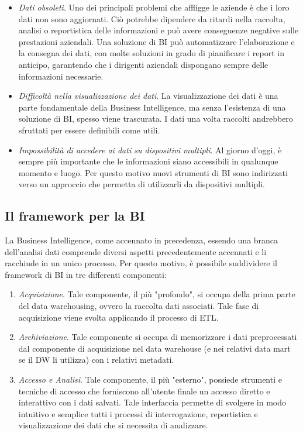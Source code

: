 \begin{itemize}
    \item \textit{Dati obsoleti}. Uno dei principali problemi che affligge le aziende è che i loro dati non sono aggiornati. Ciò potrebbe dipendere da ritardi nella raccolta, analisi o reportistica delle informazioni e può avere conseguenze negative sulle prestazioni aziendali. Una soluzione di BI può automatizzare l'elaborazione e la consegna dei dati, con molte soluzioni in grado di pianificare i report in anticipo, garantendo che i dirigenti aziendali dispongano sempre delle informazioni necessarie.
    \item \textit{Difficoltà nella visualizzazione dei dati}. La visualizzazione dei dati è una parte fondamentale della Business Intelligence, ma senza l'esistenza di una soluzione di BI, spesso viene trascurata. I dati una volta raccolti andrebbero sfruttati per essere definibili come utili.
    \item \textit{Impossibilità di accedere ai dati su dispositivi multipli}. Al giorno d'oggi, è sempre più importante che le informazioni siano accessibili in qualunque momento e luogo. Per questo motivo nuovi strumenti di BI sono indirizzati verso un approccio che permetta di utilizzarli da dispositivi multipli.
\end{itemize}

\subsection{Il framework per la BI}
La Business Intelligence, come accennato in precedenza, essendo una branca dell'analisi dati comprende diversi aspetti precedentemente accennati e li racchiude in un unico processo. Per questo motivo, è possibile suddividere il framework di BI in tre differenti componenti:\cite{academiaedu_bi_integrated_approach}

\begin{enumerate}
    \item \textit{Acquisizione}. Tale componente, il più "profondo", si occupa della prima parte del data warehousing, ovvero la raccolta dati associati. Tale fase di acquisizione viene svolta applicando il processo di ETL.
    \item \textit{Archiviazione}. Tale componente si occupa di memorizzare i dati preprocessati dal componente di acquisizione nel data warehouse (e nei relativi data mart se il DW li utilizza) con i relativi metadati.
    \item \textit{Accesso e Analisi}. Tale componente, il più "esterno", possiede strumenti e tecniche di accesso che forniscono all'utente finale un accesso diretto e interattivo con i dati salvati. Tale interfaccia permette di svolgere in modo intuitivo e semplice tutti i processi di interrogazione, reportistica e visualizzazione dei dati che si necessita di analizzare.
\end{enumerate}

